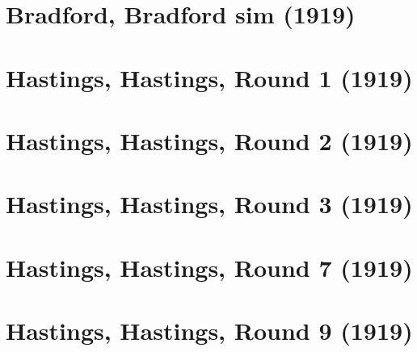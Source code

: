 \documentclass[11pt]{article}
\begin{document}


\clearpage



\clearpage



\clearpage

\section{Bradford, Bradford sim (1919)}


\clearpage



\clearpage



\clearpage



\clearpage



\clearpage



\clearpage

\section{Hastings, Hastings, Round 1 (1919)}


\clearpage

\section{Hastings, Hastings, Round 2 (1919)}


\clearpage

\section{Hastings, Hastings, Round 3 (1919)}


\clearpage

\section{Hastings, Hastings, Round 7 (1919)}


\clearpage

\section{Hastings, Hastings, Round 9 (1919)}

\end{document}
